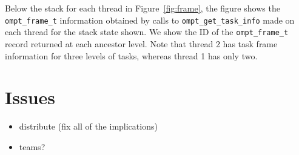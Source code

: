 \documentclass{article}
\begin{document}
Below the stack for each thread in Figure~\ref{fig:frame}, the figure shows the \lstinline|ompt_frame_t| information obtained by calls to \lstinline|ompt_get_task_info| made on each thread for the stack state shown. We show the ID of the \lstinline|ompt_frame_t| record returned at each ancestor level. Note that thread 2 has task frame information for three levels of tasks, whereas thread 1 has only two.

\clearpage
{\color{red}
\section{Issues}
\begin{itemize}
\item distribute (fix all of the implications)
\item teams?
\end{itemize}
}
\end{document}
